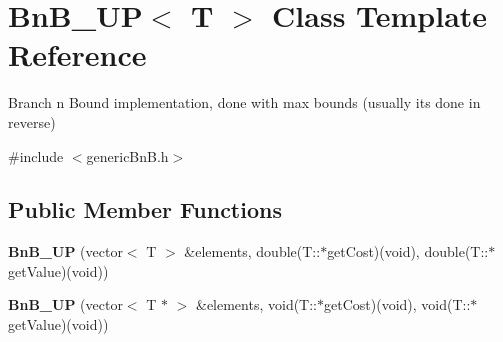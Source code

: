 \hypertarget{class_bn_b___u_p}{}\section{Bn\+B\+\_\+\+U\+P$<$ T $>$ Class Template Reference}
\label{class_bn_b___u_p}


Branch n Bound implementation, done with max bounds (usually it\textquotesingle{}s done in reverse)  




{\ttfamily \#include $<$generic\+Bn\+B.\+h$>$}

\subsection*{Public Member Functions}
\begin{DoxyCompactItemize}
\item 
\hypertarget{class_bn_b___u_p_a1248087eb17017dceaafcc74ad2f9a8a}{}{\bfseries Bn\+B\+\_\+\+U\+P} (vector$<$ T $>$ \&elements, double(T\+::$\ast$get\+Cost)(void), double(T\+::$\ast$get\+Value)(void))\label{class_bn_b___u_p_a1248087eb17017dceaafcc74ad2f9a8a}

\item 
\hypertarget{class_bn_b___u_p_a5072c37cae886ccbffa76633b63c1367}{}{\bfseries Bn\+B\+\_\+\+U\+P} (vector$<$ T $\ast$ $>$ \&elements, void(T\+::$\ast$get\+Cost)(void), void(T\+::$\ast$get\+Value)(void))\label{class_bn_b___u_p_a5072c37cae886ccbffa76633b63c1367}


\end{DoxyCompactItemize}
